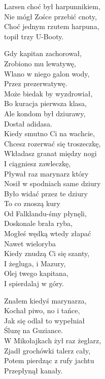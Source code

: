 \begin{multicols}{2}
Larsen choć był harpunnikiem, \\
Nie mógł Zośce przebić cnoty, \\
Choć jednym rzutem harpuna, \\
topił trzy U-Booty.\\
\newcolumn

Gdy kapitan zachorował, \\
Zrobiono mu lewatywę, \\
Wlano w niego galon wody, \\
Przez prezerwatywę.\\

Może biedak by wyzdrowiał, \\
Bo kuracja pierwsza klasa, \\
Ale kondom był dziurawy, \\
Dostał adidasa.\\

Kiedy smutno Ci na wachcie, \\
Chcesz rozerwać się troszeczkę, \\
Wkładasz granat między nogi\\
I ciągniesz zawleczkę, \\

Pływał raz marynarz który\\
Nosił w spodniach same dziury\\
Było widać przez te dziury\\
To co znoszą kury\\

Od Falklandu-śmy płynęli, \\
Doskonale brała ryba, \\
Mogłeś wędką wtedy złapać\\
Nawet wieloryba\\

Kiedy znudzą Ci się szanty, \\
I żegluga, i Mazury, \\
Olej twego kapitana, \\
I spierdalaj w góry.\\
\newcolumn

Znałem kiedyś marynarza, \\
Kochał piwo, no i tańce, \\
Jak się odlał to wypełniał\\
Śluzę na Guziance.\\

W Mikołajkach żył raz żeglarz, \\
Zjadł grochówki talerz cały, \\
Potem pierdząc z rufy jachtu\\
Przepłynął kanały.\\


\end{multicols}
